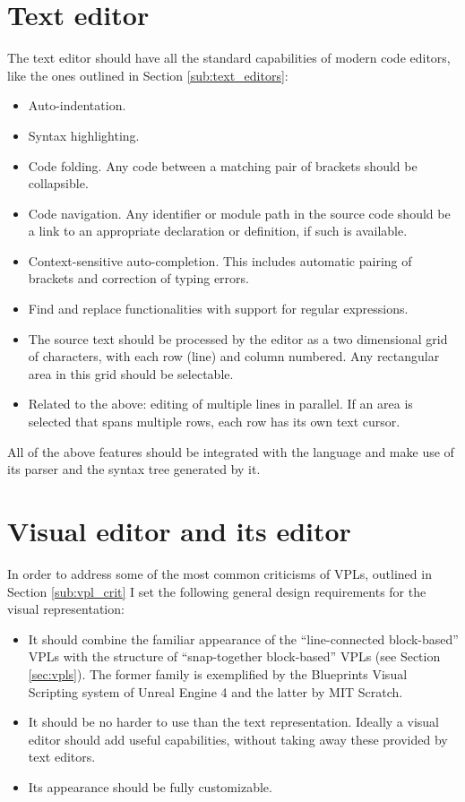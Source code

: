 \section{Text editor}
The text editor should have all the standard capabilities of modern code editors, like the ones outlined in Section \ref{sub:text_editors}:
\begin{itemize}
	\item Auto-indentation.
	\item Syntax highlighting.
	\item Code folding. Any code between a matching pair of brackets should be collapsible.
	\item Code navigation. Any identifier or module path in the source code should be a link to an appropriate declaration or definition, if such is available.
	\item Context-sensitive auto-completion. This includes automatic pairing of brackets and correction of typing errors.
    \item Find and replace functionalities with support for regular expressions.
    \item The source text should be processed by the editor as a two dimensional grid of characters, with each row (line) and column numbered. Any rectangular area in this grid should be selectable.
    \item Related to the above: editing of multiple lines in parallel. If an area is selected that spans multiple rows, each row has its own text cursor.
\end{itemize}

All of the above features should be integrated with the language and make use of its parser and the syntax tree generated by it.

\section{Visual editor and its editor}
In order to address some of the most common criticisms of VPLs, outlined in Section \ref{sub:vpl_crit} I set the following general design requirements for the visual representation:
\begin{itemize}
\item It should combine the familiar appearance of the ``line-connected block-based'' VPLs with the structure of ``snap-together block-based'' VPLs (see Section \ref{sec:vpls}). The former family is exemplified by the Blueprints Visual Scripting system of Unreal Engine 4\cite{blueprint} and the latter by MIT Scratch\cite{scratch, scratch_wikipedia}.
\item It should be no harder to use than the text representation. Ideally a visual editor should add useful capabilities, without taking away these provided by text editors.
\item Its appearance should be fully customizable.
\end{itemize}

